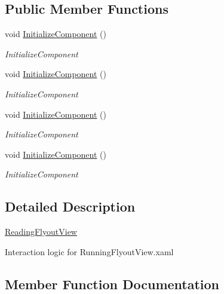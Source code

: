 \subsection*{Public Member Functions}
\begin{DoxyCompactItemize}
\item 
void \hyperlink{class_presentation_1_1_view_1_1_flyout_1_1_reading_flyout_view_a56201647e9af359ad367496f91779872}{Initialize\+Component} ()
\begin{DoxyCompactList}\small\item\em Initialize\+Component \end{DoxyCompactList}\item 
void \hyperlink{class_presentation_1_1_view_1_1_flyout_1_1_reading_flyout_view_a56201647e9af359ad367496f91779872}{Initialize\+Component} ()
\begin{DoxyCompactList}\small\item\em Initialize\+Component \end{DoxyCompactList}\item 
void \hyperlink{class_presentation_1_1_view_1_1_flyout_1_1_reading_flyout_view_a56201647e9af359ad367496f91779872}{Initialize\+Component} ()
\begin{DoxyCompactList}\small\item\em Initialize\+Component \end{DoxyCompactList}\item 
void \hyperlink{class_presentation_1_1_view_1_1_flyout_1_1_reading_flyout_view_a56201647e9af359ad367496f91779872}{Initialize\+Component} ()
\begin{DoxyCompactList}\small\item\em Initialize\+Component \end{DoxyCompactList}\end{DoxyCompactItemize}


\subsection{Detailed Description}
\hyperlink{class_presentation_1_1_view_1_1_flyout_1_1_reading_flyout_view}{Reading\+Flyout\+View} 

Interaction logic for Running\+Flyout\+View.\+xaml 

\subsection{Member Function Documentation}
\mbox{\label{class_presentation_1_1_view_1_1_flyout_1_1_reading_flyout_view_a56201647e9af359ad367496f91779872}} 
